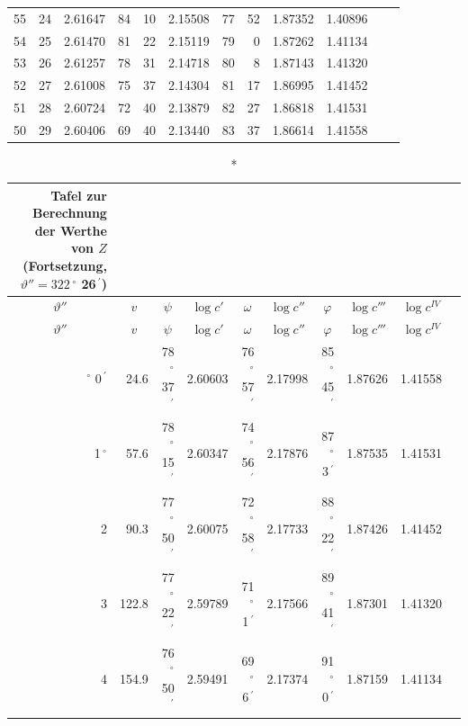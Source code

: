\documentclass[12pt,a4paper]{article}
\newcommand{\Grad}{\,^\circ}
\newcommand{\Min}{\,^\prime}
\begin{document}
\begin{small}
\begin{longtable}{@{}rr|rr|rr|rr|rr|rr@{}}
55 & 24 & 2.61647 & 84 & 10 & 2.15508 & 77 & 52 & 1.87352 & 1.40896 \\
54 & 25 & 2.61470 & 81 & 22 & 2.15119 & 79 & 0 & 1.87262 & 1.41134 \\
53 & 26 & 2.61257 & 78 & 31 & 2.14718 & 80 & 8 & 1.87143 & 1.41320 \\
52 & 27 & 2.61008 & 75 & 37 & 2.14304 & 81 & 17 & 1.86995 & 1.41452 \\
51 & 28 & 2.60724 & 72 & 40 & 2.13879 & 82 & 27 & 1.86818 & 1.41531 \\
50 & 29 & 2.60406 & 69 & 40 & 2.13440 & 83 & 37 & 1.86614 & 1.41558 \\
\end{longtable}
\end{small}

\newpage

\begin{small}
\noindent\begin{longtable}{@{}rr|rr|rr|rr|rr@{}}
\caption*{Tafel zur Berechnung der Werthe von $Z$ (Fortsetzung, $\vartheta'' = 322\Grad$ 26$\Min$)}\\
\toprule
\multicolumn{1}{c}{$\vartheta''$} & \multicolumn{1}{c}{$v$} &
\multicolumn{1}{c}{$\psi$} & \multicolumn{1}{c}{$\log c'$} &
\multicolumn{1}{c}{$\omega$} & \multicolumn{1}{c}{$\log c''$} &
\multicolumn{1}{c}{$\varphi$} & \multicolumn{1}{c}{$\log c'''$} &
\multicolumn{1}{c}{$\log c^{IV}$} \\
\midrule
\endfirsthead
\toprule
\multicolumn{1}{c}{$\vartheta''$} & \multicolumn{1}{c}{$v$} &
\multicolumn{1}{c}{$\psi$} & \multicolumn{1}{c}{$\log c'$} &
\multicolumn{1}{c}{$\omega$} & \multicolumn{1}{c}{$\log c''$} &
\multicolumn{1}{c}{$\varphi$} & \multicolumn{1}{c}{$\log c'''$} &
\multicolumn{1}{c}{$\log c^{IV}$} \\
\midrule
\endhead
\bottomrule
\endfoot
0$\Grad$ 0$\Min$ & 24.6 & 78$\Grad$ 37$\Min$ & 2.60603 & 76$\Grad$ 57$\Min$ & 2.17998 & 85$\Grad$ 45$\Min$ & 1.87626 & 1.41558 \\
1$\Grad$ & 57.6 & 78$\Grad$ 15$\Min$ & 2.60347 & 74$\Grad$ 56$\Min$ & 2.17876 & 87$\Grad$ 3$\Min$ & 1.87535 & 1.41531 \\
2 & 90.3 & 77$\Grad$ 50$\Min$ & 2.60075 & 72$\Grad$ 58$\Min$ & 2.17733 & 88$\Grad$ 22$\Min$ & 1.87426 & 1.41452 \\
3 & 122.8 & 77$\Grad$ 22$\Min$ & 2.59789 & 71$\Grad$ 1$\Min$ & 2.17566 & 89$\Grad$ 41$\Min$ & 1.87301 & 1.41320 \\
4 & 154.9 & 76$\Grad$ 50$\Min$ & 2.59491 & 69$\Grad$ 6$\Min$ & 2.17374 & 91$\Grad$ 0$\Min$ & 1.87159 & 1.41134 \\

\end{longtable}
\end{small}
\end{document}
